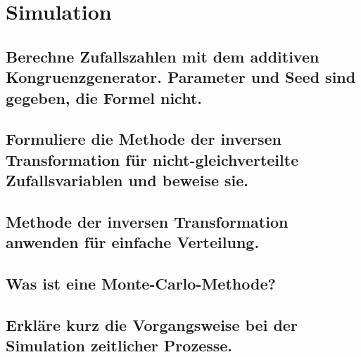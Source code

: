 \documentclass[a4paper,10pt]{article}
\begin{document}
\section{Simulation}
\subsection{Berechne Zufallszahlen mit dem additiven Kongruenzgenerator. Parameter und Seed sind gegeben, die Formel nicht.}

\subsection{Formuliere die Methode der inversen Transformation für nicht-gleichverteilte Zufallsvariablen und beweise sie.}

\subsection{Methode der inversen Transformation anwenden für einfache Verteilung.}

\subsection{Was ist eine Monte-Carlo-Methode?}

\subsection{Erkläre kurz die Vorgangsweise bei der Simulation zeitlicher Prozesse.}
\end{document}

